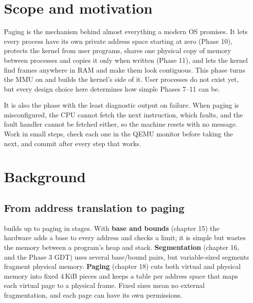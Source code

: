 \documentclass[11pt,a4paper]{article}
\begin{document}


\section{Scope and motivation}

Paging is the mechanism behind almost everything a modern OS promises. It lets every process have its own private
address space starting at zero (Phase 10), protects the kernel from user programs, shares one physical copy of memory
between processes and copies it only when written (Phase 11), and lets the kernel find frames anywhere in RAM and make
them look contiguous. This phase turns the MMU on and builds the kernel's side of it. User processes do not exist
yet, but every design choice here determines how simple Phases 7--11 can be.

It is also the phase with the least diagnostic output on failure. When paging is misconfigured, the CPU cannot fetch
the next instruction, which faults, and the fault handler cannot be fetched either, so the machine resets with no message.
Work in small steps, check each one in the QEMU monitor before taking the next, and commit after every step that
works.

\section{Background}

\subsection{From address translation to paging}

\OSTEP builds up to paging in stages. With \textbf{base and bounds}
(chapter 15) the hardware adds a base to every address and checks a limit; it is simple but wastes the memory between
a program's heap and stack. \textbf{Segmentation} (chapter 16, and the Phase 3 GDT) uses several base/bound pairs,
but variable-sized segments fragment physical memory. \textbf{Paging} (chapter 18) cuts both virtual and physical
memory into fixed 4\,KiB pieces and keeps a table per address space that maps each virtual page to a physical frame.
Fixed sizes mean no external fragmentation, and each page can have its own permissions.
\end{document}
